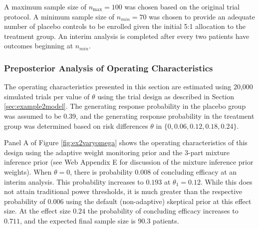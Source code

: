 \documentclass[AMA,STIX1COL,doublespace]{WileyNJD-v2}
\begin{document}

A maximum sample size of $n_{\text{max}}=100$ was chosen based on the original trial protocol.
%
A minimum sample size of $n_{min}=70$ was chosen to provide an adequate number of placebo controls to be enrolled given the initial 5:1 allocation to the treatment group.
%
An interim analysis is completed after every two patients have outcomes beginning at $n_{min}$.

\subsubsection{Preposterior Analysis of Operating Characteristics}\label{sec:ex2operatingcharacteristics} 
The operating characteristics presented in this section are estimated using 20,000 simulated trials per value of $\theta$ using the trial design as described in Section \ref{sec:example2model}. The generating response probability in the placebo group was assumed to be 0.39, and the generating response probability in the treatment group was determined based on risk differences $\theta$ in $\{0, 0.06, 0.12, 0.18, 0.24\}$.

Panel A of Figure \ref{fig:ex2varyomega} shows the operating characteristics of this design using the adaptive weight monitoring prior and the 3-part mixture inference prior (see Web Appendix E for discussion of the mixture inference prior weights). 
%
When $\theta=0$, there is probability 0.008 of concluding efficacy at an interim analysis.
%
This probability increases to $0.193$ at $\theta_1=0.12$. While this does not attain traditional power thresholds, it is much greater than the respective probability of 0.006 using the default (non-adaptive) skeptical prior at this effect size.
%
At the effect size $0.24$ the probability of concluding efficacy increases to $0.711$, and the expected final sample size is 90.3 patients.
\end{document}
